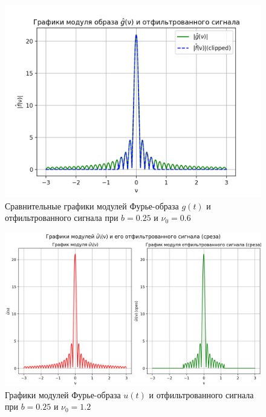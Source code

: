 \begin{figure}[ht!]
    \centering
    \includegraphics[scale=0.55]{media/1 task/high_freq/Fourier_Image_Comparison_0,25_-0,5975975975975976.png}
    \caption{Сравнительные графики модулей Фурье-образа $g(t)$ и отфильтрованного сигнала при $b=0.25$ и $\nu_0=0.6$}
    \label{fig:fourc_025_06}
\end{figure}

\begin{figure}[ht!]
    \centering
    \includegraphics[scale=0.55]{media/1 task/high_freq/Fourier_Image_0,25_-1,1981981981981982.png}
    \caption{Графики модулей Фурье-образа $u(t)$ и отфильтрованного сигнала при $b=0.25$ и $\nu_0=1.2$}
    \label{fig:four_025_12}
\end{figure}

